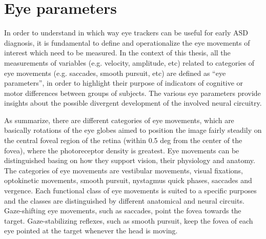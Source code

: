 \section{Eye parameters}
\label{sec:eyeparameters}

\newline


In order to understand in which way eye trackers can be useful for early ASD diagnosis, it is fundamental to define and operationalize the eye movements of interest which need to be measured. In the context of this thesis, all the measurements of variables (e.g. velocity, amplitude, etc) related to categories of eye movements (e.g. saccades, smooth pursuit, etc) are defined as “eye parameters”, in order to highlight their purpose of indicators of cognitive or motor differences between groups of subjects. The various eye parameters provide insights about the possible divergent development of the involved neural circuitry.

As \citet[pp. 2-5]{leigh2015neurology} summarize, there are different categories of eye movements, which are basically rotations of the eye globes aimed to position the image fairly steadily on the central foveal region of the retina (within 0.5 deg from the center of the fovea), where the photoreceptor density is greatest. Eye movements can be distinguished basing on how they support vision, their physiology and anatomy. The categories of eye movements are vestibular movements, visual fixations, optokinetic movements, smooth pursuit, nystagmus quick phases, saccades and vergence. Each functional class of eye movements is suited to a specific purposes and the classes are distinguished by different anatomical and neural circuits. Gaze-shifting eye movements, such as saccades, point the fovea towards the target. Gaze-stabilizing reflexes, such as smooth pursuit, keep the fovea of each eye pointed at the target whenever the head is moving.

